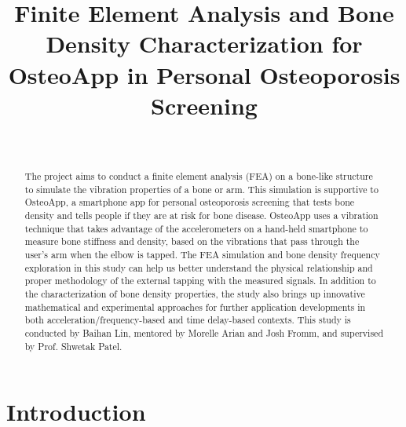 \documentclass{sigchi}
\begin{document}
\title{Finite Element Analysis and Bone Density Characterization for OsteoApp in Personal Osteoporosis Screening}

\author{%
  \\
}

\maketitle

\begin{abstract}
The project aims to conduct a finite element analysis (FEA) on a bone-like structure to simulate the vibration properties of a bone or arm. This simulation is supportive to OsteoApp, a smartphone app for personal osteoporosis screening that tests bone density and tells people if they are at risk for bone disease. OsteoApp uses a vibration technique that takes advantage of the accelerometers on a hand-held smartphone to measure bone stiffness and density, based on the vibrations that pass through the user's arm when the elbow is tapped. The FEA simulation and bone density frequency exploration in this study can help us better understand the physical relationship and proper methodology of the external tapping with the measured signals. In addition to the characterization of bone density properties, the study also brings up innovative mathematical and experimental approaches for further application developments in both acceleration/frequency-based and time delay-based contexts. This study is conducted by Baihan Lin, mentored by Morelle Arian and Josh Fromm, and supervised by Prof. Shwetak Patel.

\end{abstract}



\section{Introduction}
\end{document}
